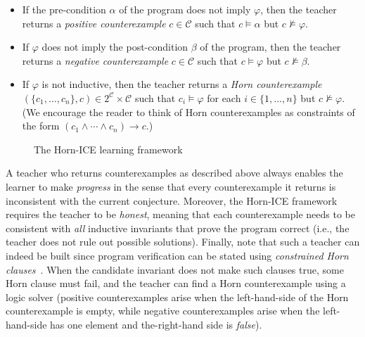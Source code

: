 \begin{itemize}
    \item If the pre-condition $\alpha$ of the program does not imply $\varphi$, then the teacher returns a \emph{positive counterexample} $c \in \mathcal C$ such that $c \models \alpha$ but $c \not \models \varphi$.
    \item If $\varphi$ does not imply the post-condition $\beta$ of the program, then the teacher returns a \emph{negative counterexample} $c \in \mathcal C$ such that $c \models \varphi$ but $c \not \models \beta$.
     \item If $\varphi$ is not inductive, then the teacher returns a \emph{Horn counterexample} $(\{ c_1, \ldots, c_n \}, c) \in 2^\mathcal C \times \mathcal C$ such that $c_i \models \varphi$ for each $i \in \{ 1, \ldots, n \}$ but $c \not\models \varphi$. (We encourage the reader to think of Horn counterexamples as constraints of the form $(c_1 \land \cdots \land c_n) \rightarrow c$.)
\end{itemize}

\begin{figure}[t]
    \centering
    \caption{The Horn-ICE learning framework~\cite{DBLP:conf/tacas/ChampionC0S18,DBLP:journals/pacmpl/EzudheenND0M18}}
    \label{fig:horn-ice-learning}
\end{figure}

A teacher who returns counterexamples as described above always enables the learner to make \emph{progress} in the sense that every counterexample it returns is inconsistent with the current conjecture.
Moreover, the Horn-ICE framework requires the teacher to be \emph{honest}, meaning that each counterexample needs to be consistent with \emph{all} inductive invariants that prove the program correct (i.e., the teacher does not rule out possible solutions).
Finally, note that such a teacher can indeed be built since program verification can be stated using \emph{constrained Horn clauses}~\cite{DBLP:conf/pldi/GrebenshchikovLPR12}.
When the candidate invariant does not make such clauses true, some Horn clause must fail, and the teacher can find a Horn counterexample using a logic solver (positive counterexamples arise when the left-hand-side of the Horn counterexample is empty, while negative counterexamples arise when the left-hand-side has one element and the-right-hand side is \emph{false}).


